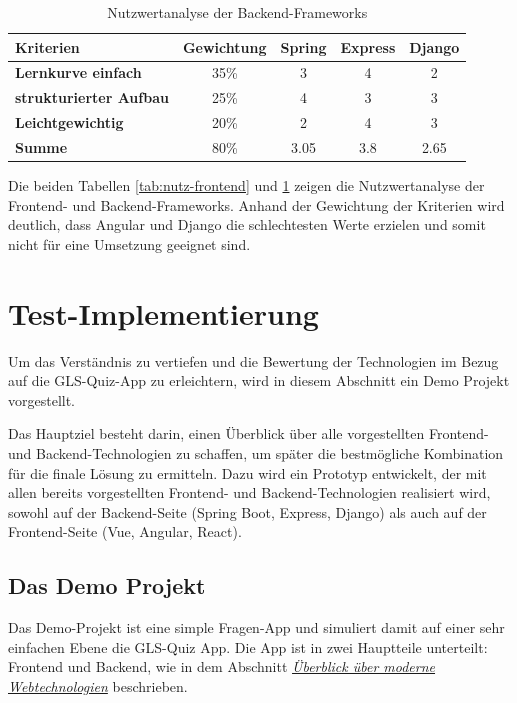\documentclass[biblatex]{lni}
\begin{document}
\begin{table}[h!]
  \centering
  \caption{Nutzwertanalyse der Backend-Frameworks}
  \label{tab:nutz-backend}
  \begin{tabular}{@{}lcccc@{}}
    \toprule
    \textbf{Kriterien} & \textbf{Gewichtung} & \textbf{Spring} & \textbf{Express} & \textbf{Django} \\ \midrule
    \textbf{Lernkurve einfach} & 35\% & 3 & 4 & 2 \\ \midrule
    \textbf{strukturierter Aufbau} & 25\% & 4 & 3 & 3 \\ \midrule
    \textbf{Leichtgewichtig} & 20\% & 2 & 4 & 3 \\ \midrule
    \textbf{Summe} & 80\% & 3.05 & 3.8 & 2.65 \\ \bottomrule
  \end{tabular}
\end{table}

Die beiden Tabellen \ref{tab:nutz-frontend} und \ref{tab:nutz-backend} zeigen die Nutzwertanalyse der Frontend- und Backend-Frameworks.
Anhand der Gewichtung der Kriterien wird deutlich,
dass Angular und Django die schlechtesten Werte erzielen und somit nicht für eine Umsetzung geeignet sind.

\section{Test-Implementierung}

Um das Verständnis zu vertiefen und die Bewertung der Technologien im Bezug auf die GLS-Quiz-App zu erleichtern,
wird in diesem Abschnitt ein Demo Projekt vorgestellt.

Das Hauptziel besteht darin,
einen Überblick über alle vorgestellten Frontend- und Backend-Technologien zu schaffen,
um später die bestmögliche Kombination für die finale Lösung zu ermitteln.
Dazu wird ein Prototyp entwickelt, der mit allen bereits vorgestellten Frontend- und Backend-Technologien realisiert wird,
sowohl auf der Backend-Seite (Spring Boot, Express, Django) als auch auf der Frontend-Seite (Vue, Angular, React).

\subsection{Das Demo Projekt}

Das Demo-Projekt ist eine simple Fragen-App und simuliert damit auf einer sehr einfachen Ebene die GLS-Quiz App.
Die App ist in zwei Hauptteile unterteilt: Frontend und Backend, wie in dem Abschnitt \hyperref[sec:moderne-webtechnologien]{\textit{Überblick über moderne Webtechnologien}} beschrieben.
\end{document}

